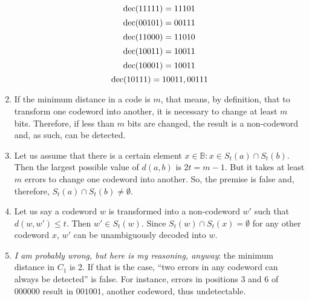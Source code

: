 \begin{enumerate}
        $$\operatorname{dec}(11111) = 11101$$
        $$\operatorname{dec}(00101) = 00111$$
        $$\operatorname{dec}(11000) = 11010$$
        $$\operatorname{dec}(10011) = 10011$$
        $$\operatorname{dec}(10001) = 10011$$
        $$\operatorname{dec}(10111) = 10011, 00111$$
    \item If the minimum distance in a code is $m$, that means, by definition, that to transform one codeword into another, it is necessary to change at least $m$ bits.
        Therefore, if less than $m$ bits are changed, the result is a non-codeword and, as such, can be detected.
    \item Let us assume that there is a certain element $x \in \mathbb{B}: x \in S_t(a) \cap S_t(b)$.
        Then the largest possible value of $d(a, b)$ is $2t = m - 1$.
        But it takes at least $m$ errors to change one codeword into another. So, the premise is false and, therefore, $S_t(a) \cap S_t(b) \ne \emptyset$.
    \item Let us say a codeword $w$ is transformed into a non-codeword $w'$ such that $d(w, w') \leqslant t$. Then $w' \in S_t(w)$.
        Since $S_t(w) \cap S_t(x) = \emptyset$ for any other codeword $x$, $w'$ can be unambiguously decoded into $w$.
    \item \emph{I am probably wrong, but here is my reasoning, anyway}: the minimum distance in $C_1$ is 2. 
        If that is the case, ``two errors in any codeword can always be detected'' is false. 
        For instance, errors in positions 3 and 6 of $000000$ result in $001001$, another codeword, thus undetectable.
\end{enumerate}
